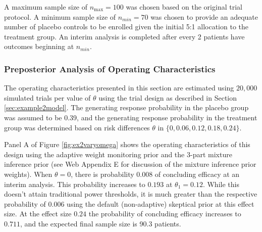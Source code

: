 \documentclass[useAMS,usenatbib,referee]{biom}
\begin{document}

A maximum sample size of $n_{\text{max}}=100$ was chosen based on the original trial protocol.
%
A minimum sample size of $n_{min}=70$ was chosen to provide an adequate number of placebo controls to be enrolled given the initial 5:1 allocation to the treatment group.
%
An interim analysis is completed after every 2 patients have outcomes beginning at $n_{min}$.

\subsubsection{Preposterior Analysis of Operating Characteristics}\label{sec:ex2operatingcharacteristics} 
The operating characteristics presented in this section are estimated using $20,000$ simulated trials per value of $\theta$ using the trial design as described in Section \ref{sec:example2model}. The generating response probability in the placebo group was assumed to be 0.39, and the generating response probability in the treatment group was determined based on risk differences $\theta$ in $\{0, 0.06, 0.12, 0.18, 0.24\}$.

Panel A of Figure \ref{fig:ex2varyomega} shows the operating characteristics of this design using the adaptive weight monitoring prior and the 3-part mixture inference prior (see Web Appendix E for discussion of the mixture inference prior weights). 
%
When $\theta=0$, there is probability 0.008 of concluding efficacy at an interim analysis.
%
This probability increases to $0.193$ at $\theta_1=0.12$. While this doesn't attain traditional power thresholds, it is much greater than the respective probability of 0.006 using the default (non-adaptive) skeptical prior at this effect size.
%
At the effect size $0.24$ the probability of concluding efficacy increases to $0.711$, and the expected final sample size is 90.3 patients.
\end{document}
